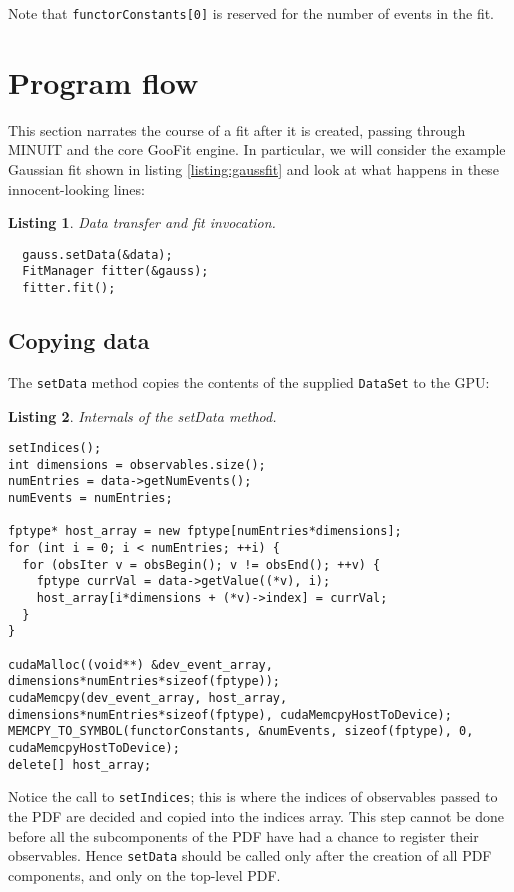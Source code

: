 \documentclass[12pt,pdflatex]{article}
\newtheorem{listing}{Listing}
\begin{document}
Note that \verb|functorConstants[0]| is reserved for the number of events
in the fit. 

\section{Program flow} 
\label{sec:engine}

This section narrates the course of a fit after it is created, passing through
MINUIT and the core GooFit engine. In particular, we will consider the example
Gaussian fit shown in listing \ref{listing:gaussfit} and look at what happens
in these innocent-looking lines:
\begin{listing}
\label{listing:actualfit}
Data transfer and fit invocation.

\begin{verbatim}
  gauss.setData(&data);
  FitManager fitter(&gauss); 
  fitter.fit(); 
\end{verbatim}
\end{listing} 

\subsection{Copying data} 

The \texttt{setData} method copies the contents of the supplied \texttt{DataSet}
to the GPU:
\begin{listing}
\label{listing:setData}
Internals of the setData method.

\begin{verbatim}
setIndices();
int dimensions = observables.size();
numEntries = data->getNumEvents(); 
numEvents = numEntries; 

fptype* host_array = new fptype[numEntries*dimensions];
for (int i = 0; i < numEntries; ++i) {
  for (obsIter v = obsBegin(); v != obsEnd(); ++v) {
    fptype currVal = data->getValue((*v), i);
    host_array[i*dimensions + (*v)->index] = currVal; 
  }
}

cudaMalloc((void**) &dev_event_array, dimensions*numEntries*sizeof(fptype)); 
cudaMemcpy(dev_event_array, host_array, dimensions*numEntries*sizeof(fptype), cudaMemcpyHostToDevice);
MEMCPY_TO_SYMBOL(functorConstants, &numEvents, sizeof(fptype), 0, cudaMemcpyHostToDevice); 
delete[] host_array; 
\end{verbatim}
\end{listing} 
Notice the call to \texttt{setIndices}; this is where the indices
of observables passed to the PDF are decided and copied into the indices
array. This step cannot be done before all the subcomponents of the 
PDF have had a chance to register their observables. Hence \texttt{setData}
should be called only after the creation of all PDF components, and only
on the top-level PDF. 
\end{document}
